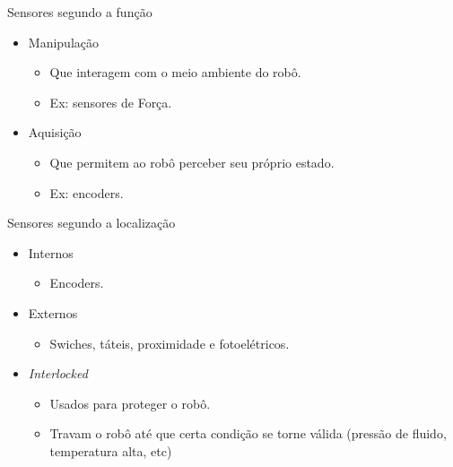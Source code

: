 \documentclass[aspectratio=169,
				xcolor=table]{beamer}
\begin{document}
		\begin{frame}{Sensores segundo a função}
			\begin{itemize}
					\item Manipulação
					\begin{itemize}
						\item Que interagem com o meio ambiente do robô. 
						\item Ex: sensores de Força.
					\end{itemize}
					\vspace{0.8cm}
					\item Aquisição
					\begin{itemize}
						\item Que permitem ao robô perceber seu próprio estado.
						\item Ex: encoders.				
					\end{itemize}
			\end{itemize}
		\end{frame}	
		
		\begin{frame}{Sensores segundo a localização}
				\begin{itemize}
					\item Internos
					\begin{itemize}
						\item Encoders.				
					\end{itemize}
				\vspace{0.8cm}
					\item Externos
					\begin{itemize}
						\item Swiches, táteis, proximidade e fotoelétricos.
					\end{itemize}
				\vspace{0.8cm}
					\item \textit{Interlocked}
					\begin{itemize}
						\item Usados para proteger o robô.
						\item Travam o robô até que certa condição se torne válida (pressão de fluido, temperatura alta, etc)
					\end{itemize}
				\end{itemize}
		\end{frame}		
	
\end{document}
